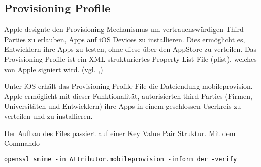 
\subsection{Provisioning Profile}
\label{sec:ProvisioningProfile}
Apple designte den Provisioning Mechanismus um vertrauenswürdigen Third Parties zu erlauben, Apps auf iOS Devices zu installieren. Dies ermöglicht es, Entwicklern ihre Apps zu testen, ohne diese über den AppStore zu verteilen. Das \glqq Provisioning Profile\grqq{} ist ein XML strukturiertes \glqq Property List File (plist)\grqq, welches von Apple signiert wird. (vgl. \cite{PropertyFile[1]},\cite{ProvisioningProfile[1]}) \par

Unter iOS erhält das Provisioning Profile File die Dateiendung \glqq mobileprovision\grqq. Apple ermöglicht mit dieser Funktionalität, autorisierten third Parties (Firmen, Universitäten und Entwicklern) ihre Apps in einem geschlossen Userkreis zu verteilen und zu installieren. \par

Der Aufbau des Files passiert auf einer \glqq Key Value Pair\grqq{} Struktur. 
Mit dem Commando 

\lstset{
    language=bash,
    }
\begin{lstlisting}[caption={Openssl-Befehl: Struktur Provisioning Profile }]
    openssl smime -in Attributor.mobileprovision -inform der -verify 
\end{lstlisting}

 

